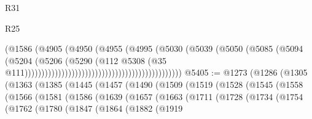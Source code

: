 \begin{lexlean}{R31}
\begin{lexlean}{R25}
\begin{coremodule}
{{{{{{{{{{{{{{{{{{{{{{{{{{{{{{{{{{{{{{{{{{{{{{{{{{{{{{{{{{{{{{{{{{{{{{{{{{{{{{{{{{{{{{{{{{{{{{{{{{{{{{{{{{{{{{{{{{{{{{{{{{{{{{{{{{{{{{{{{{{{{{{{{{{{{{{{{{{{{{{{{{{{{{{{{{{{{{{{{{{{{{{{{{{{{{{{{{{{{{{                                                                    (@1586
                                                                      (@4905
                                                                        (@4950
                                                                          (@4955
                                                                            (@4995
                                                                              (@5030
                                                                                (@5039
                                                                                  (@5050
                                                                                    (@5085
                                                                                      (@5094
                                                                                        (@5204
                                                                                          (@5206
                                                                                            (@5290
                                                                                              (@112
                                                                                                @5308
                                                                                                (@35
                                                                                                  @111)))))))))))))))))))))))))))))))))))))))))))))))
@5405 := @1273
    (@1286
      (@1305
        (@1363
          (@1385
            (@1445
              (@1457
                (@1490
                  (@1509
                    (@1519
                      (@1528
                        (@1545
                          (@1558
                            (@1566
                              (@1581
                                (@1586
                                  (@1639
                                    (@1657
                                      (@1663
                                        (@1711
                                          (@1728
                                            (@1734
                                              (@1754
                                                (@1762
                                                  (@1780
                                                    (@1847
                                                      (@1864
                                                        (@1882
                                                          (@1919
}}}}}}}}}}}}}}}}}}}}}}}}}}}}}}}}}}}}}}}}}}}}}}}}}}}}}}}}}}}}}}}}}}}}}}}}}}}}}}}}}}}}}}}}}}}}}}}}}}}}}}}}}}}}}}}}}}}}}}}}}}}}}}}}}}}}}}}}}}}}}}}}}}}}}}}}}}}}}}}}}}}}}}}}}}}}}}}}}}}}}}}}}}}}}}}}}}}}}}}
\end{coremodule}
\end{lexlean}
\end{lexlean}
